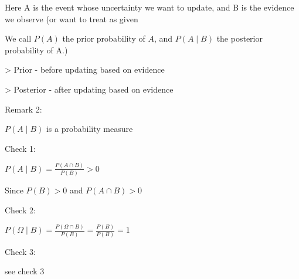 \documentclass[12pt]{article}
\begin{document}
Here A is the event whose uncertainty we want to update, and B is the evidence we observe (or want to treat as given

We call \(P(A)\) the prior probability of \(A\), and \(P(A \mid B)\) the posterior probability of A.)

> Prior - before updating based on evidence

> Posterior - after updating based on evidence

Remark 2:

\(P(A \mid B)\) is a probability measure

Check 1:

\(P(A \mid B) = \frac{P(A \cap B)}{P(B)} > 0\)

Since \(P(B) > 0\) and \(P(A \cap B) > 0\)

Check 2:

\(P(\Omega \mid B) = \frac{P(\Omega \cap B)}{P(B)} = \frac{P(B)}{P(B)} = 1\)

Check 3:

see check 3
\end{document}

